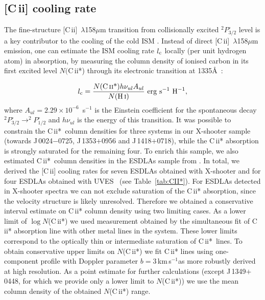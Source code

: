 \documentclass[fleqn,usenatbib,useAMS]{mnras}
\newcommand{\kms}{\,km\,s$^{-1}$} %
\newcommand{\HI}{H\,{\sc i}}
\newcommand{\CII}{C\,{\sc ii}}
\begin{document}
\subsection{[\CII] cooling rate}\label{subsec:cooling_rate}
The fine-structure [\CII]~$\lambda$158$\mu$m transition from collisionally excited $^2P^{\circ}_{3/2}$ level \citep[e.g.][]{Goldsmith2012} is a key contributor to the cooling of the cold ISM \citep[e.g.][]{Lagache2018}. Instead of direct [\CII]~$\lambda$158$\mu$m emission, one can estimate the ISM cooling rate $l_{\rm c}$ locally (per unit hydrogen atom) in absorption, by measuring the column density of ionised carbon in its first excited level $N($\CII*) through its electronic transition at 1335\AA\ 
\citep{Pottasch1979, Wolfe2003}:

\begin{equation}\label{eq:cooling_rate}
    l_{\rm c} = \frac{N(\text{\CII*}) h\nu_{ul}A_{ul}}{N(\text{\HI})}{\rm~erg~s^{-1}~H^{-1}},
\end{equation}
where $A_{ul}=2.29 \times 10^{-6}$~s$^{-1}$ is the Einstein coefficient for the spontaneous decay $^2P^{\circ}_{3/2}\to ^2P^{\circ}_{1/2}$ and $h\nu_{ul}$ is the energy of this transition. 
It was possible to constrain the \CII*\ column densities for three systems in our X-shooter sample (towards J\,0024$-$0725, J\,1353$+$0956 and J\,1418$+$0718), while the \CII* absorption is strongly saturated for the remaining four. 
To enrich this sample, 
we also estimated \CII*\ column densities in the ESDLAs sample from \citet{Ranjan2020}. In total, we derived the [\CII] cooling rates for seven ESDLAs obtained with X-shooter and for four ESDLAs obtained with UVES~\citep{Dekker2000} 
(see Table~\ref{tab:CII*}). For ESDLAs detected in X-shooter spectra we can not exclude saturation of the \CII* absorption, since the velocity structure is likely unresolved. Therefore we obtained a conservative interval estimate on \CII* column density using two limiting cases. As a lower limit of $\log N$(\CII*) we used measurement obtained by the simultaneous fit of \CII* absorption line with other metal lines in the system. These lower limits correspond to the optically thin or intermediate saturation of \CII*\ lines. To obtain conservative upper limits on $N$(\CII*) we fit \CII* lines using one-component profile with Doppler parameter $b=3$\kms as more robustly derived at high resolution. 
As a point estimate for further calculations (except J\,1349$+$0448, for which we provide only a lower limit to $N$(\CII*)) we use the mean column density of the obtained $N$(\CII*) range. 
\end{document}
